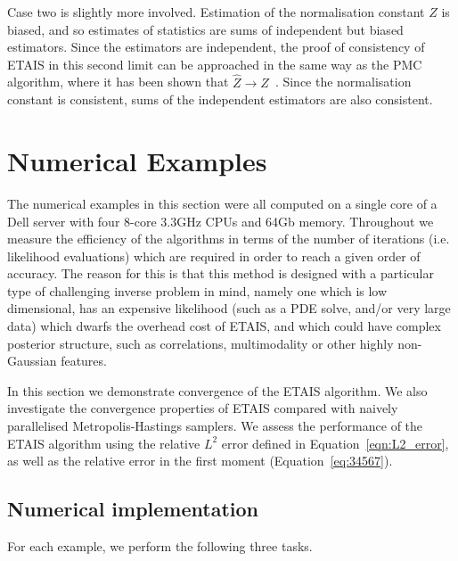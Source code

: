 \documentclass[final]{siamltex}
\begin{document}
Case two is slightly more involved. Estimation of the normalisation constant $Z$ is biased, and so estimates of statistics are sums of independent but biased estimators. Since the estimators are independent, the proof of consistency of ETAIS in this second limit can be approached in the same way as the PMC algorithm, where it has been shown that $\hat{Z}\rightarrow Z$~\cite{robert2013monte}. Since the normalisation constant is consistent, sums of the independent estimators are also consistent.


\section{Numerical Examples}\label{Sec:Num}
The numerical examples in this section were all computed on a single
core of a Dell
server with four 8-core 3.3GHz CPUs and 64Gb memory. Throughout we
measure the efficiency of the algorithms in terms of the number of
iterations (i.e. likelihood evaluations) which are required in order
to reach a given order of accuracy. The reason for this is that this
method is designed with a particular type of challenging inverse
problem in mind, namely one which is low dimensional, has an expensive
likelihood (such as a PDE solve, and/or very large data) which dwarfs
the overhead cost of ETAIS, and which could have complex posterior
structure, such as correlations, multimodality or other highly
non-Gaussian features. 

In this section we demonstrate convergence of the ETAIS algorithm. We
also investigate the convergence properties of ETAIS compared with
naively parallelised Metropolis-Hastings samplers. We assess the
performance of the ETAIS algorithm using the relative $L^2$ error
defined in Equation~\eqref{eqn:L2_error}, as well as the relative error in the
first moment (Equation~\eqref{eq:34567}).


\subsection{Numerical implementation}
\label{sec:Implementation P1}

For each example, we perform the following three tasks.
\end{document}
